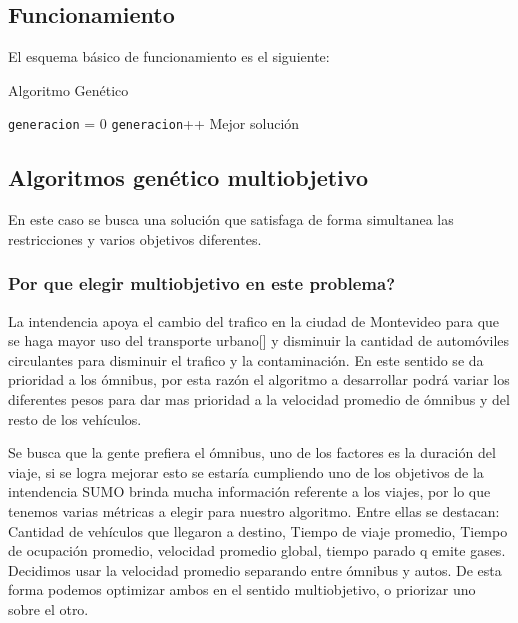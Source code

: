 \subsection{Funcionamiento}

El esquema básico de funcionamiento es el siguiente:


\begin{algorithm}%
	\caption{Algoritmo Genético}
	\label{alg:algoritmo_genetico_simple}
	\begin{algorithmic} [1] 
		{
			\STATE \texttt{generacion} = 0
			\STATE \texttt{generacion}++
			\ENDWHILE
			\RETURN Mejor solución
		}
	\end{algorithmic}
\end{algorithm}




\subsection{Algoritmos genético multiobjetivo}

En este caso se busca una solución que satisfaga de forma simultanea las restricciones y varios objetivos diferentes.

\subsubsection{Por que elegir multiobjetivo en este problema?}
La intendencia apoya el cambio del trafico en la ciudad de Montevideo para que se haga mayor uso del transporte urbano[] y disminuir la cantidad de automóviles circulantes para disminuir el trafico y la contaminación. En este sentido se da prioridad a los ómnibus, por esta razón el algoritmo a desarrollar podrá variar los diferentes pesos para dar mas prioridad a la velocidad promedio de ómnibus y del resto de los vehículos.
 
Se busca que la gente prefiera el ómnibus, uno de los factores es la duración del viaje, si se logra mejorar esto se estaría cumpliendo uno de los objetivos de la intendencia
SUMO brinda mucha información referente a los viajes, por lo que tenemos varias métricas a elegir para nuestro algoritmo. Entre ellas se destacan: Cantidad de vehículos que llegaron a destino, Tiempo de viaje promedio, Tiempo de ocupación promedio, velocidad promedio global, tiempo parado q emite gases. Decidimos usar la velocidad promedio separando entre ómnibus y autos. De esta forma podemos optimizar ambos en el sentido multiobjetivo, o priorizar uno sobre el otro.


